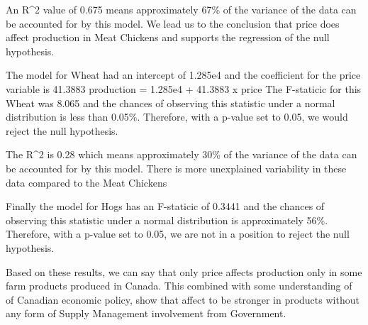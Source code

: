 An R^2 value of  0.675  means approximately 67\% of the variance of the data can be accounted for by this model. We lead us to the conclusion that price does affect production in Meat Chickens and supports the regression of the null hypothesis. 

The model for Wheat had an intercept of 1.285e4 and the coefficient for the price variable is 41.3883
\newline
production  =  1.285e4 + 41.3883 x price 
\newline
The F-staticic for this Wheat was 8.065 and the chances of observing this statistic under a normal distribution is less than 0.05\%. Therefore, with a p-value set to 0.05, we would reject the null hypothesis. 

The R^2 is 0.28 which means approximately 30\% of the variance of the data can be accounted for by this model. There is more unexplained variability in these data compared to the Meat Chickens

Finally the model for Hogs has an F-staticic of 0.3441 and the chances of observing this statistic under a normal distribution is approximately 56\%. Therefore, with a p-value set to 0.05, we are not in a position to reject the null hypothesis. 

Based on these results, we can say that only price affects production only in some farm products produced in Canada. This combined with some understanding of of Canadian economic policy, show that affect to be stronger in products without any form of Supply Management involvement from Government. 
